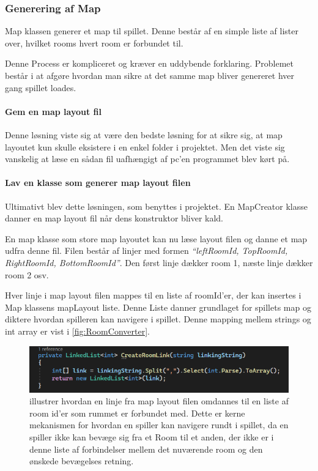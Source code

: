 \subsubsection{Generering af Map}
\noindent Map klassen generer et map til spillet. Denne består af en
simple liste af lister over, hvilket rooms hvert room er 
forbundet til.

Denne Process er kompliceret og kræver en uddybende forklaring. Problemet 
består i at afgøre hvordan man sikre at det samme map bliver genereret
hver gang spillet loades. 

\paragraph{Gem en map layout fil \\}
Denne løsning viste sig at være den bedste løsning for at sikre sig, at 
map layoutet kun skulle eksistere i en enkel folder i projektet.
Men det viste sig vanskelig at læse en sådan fil uafhængigt af pc'en 
programmet blev kørt på.

\paragraph{Lav en klasse som generer map layout filen \\}
Ultimativt blev dette løsningen, som benyttes i projektet. En MapCreator
klasse danner en map layout fil når dens konstruktor bliver kald.

En map klasse som store map layoutet kan nu læse layout filen og 
danne et map udfra denne fil.
Filen består af linjer med formen \textit{``leftRoomId, TopRoomId, RightRoomId, BottomRoomId''}. Den først linje dækker room 1, næste linje dækker room 2 osv.

Hver linje i map layout filen mappes til en liste af roomId'er,  der kan insertes i Map
klassens mapLayout liste. Denne Liste danner grundlaget for spillets map og 
diktere hvordan spilleren kan navigere i spillet. Denne mapping mellem strings og int array
er vist i \autoref{fig:RoomConverter}.

\begin{figure}[H]
  \centering
  \includegraphics[scale=0.8]{02-Body/Implementering/GameEngineImplementering/Images/MappingRoomString.png}
    \caption{illustrer hvordan en linje fra map layout filen omdannes til en liste af room id'er 
           som rummet er forbundet med. Dette er kerne mekanismen for hvordan en spiller kan navigere
           rundt i spillet, da en spiller ikke kan bevæge sig fra et Room til et anden, der ikke er 
           i denne liste af forbindelser mellem det nuværende room og den ønskede bevægelses retning.}
  \label{fig:RoomConverter}
\end{figure}

